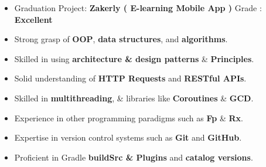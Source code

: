 \documentclass[10pt,a4paper,ragged2e,withhyper]{altacv}
\begin{document}
\begin{paracol}{2}







\switchcolumn
\normalsize\begin{itemize}
\item Graduation Project: \textbf{Zakerly ( E-learning Mobile App )} Grade : \textbf{Excellent}
\end{itemize}

{\normalsize\begin{itemize}

\item Strong grasp of \textbf{OOP}, \textbf{data structures}, and \textbf{algorithms}.
\item Skilled in using  \textbf{architecture \& design patterns} \& \textbf{Principles}.
\item Solid understanding of \textbf{HTTP Requests} and \textbf{RESTful APIs}.
\item Skilled in \textbf{multithreading}, \& libraries like \textbf{Coroutines} \& \textbf{GCD}.
\item Experience in other programming paradigms such as \textbf{Fp} \& \textbf{Rx}.
\item Expertise in version control systems such as \textbf{Git} and \textbf{GitHub}.
\item Proficient in Gradle \textbf{buildSrc \& Plugins} and \textbf{catalog versions}.

\end{itemize}}


\begin{multicols}{3}


\end{multicols}
\end{paracol}
\end{document}
